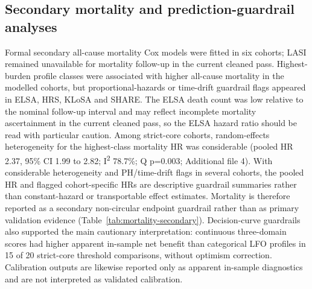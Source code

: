 \documentclass[pdflatex,sn-vancouver-num]{sn-jnl}
\begin{document}
\FloatBarrier

\subsection{Secondary mortality and prediction-guardrail analyses}

Formal secondary all-cause mortality Cox models were fitted in six cohorts; LASI remained unavailable for mortality follow-up in the current cleaned pass. Highest-burden profile classes were associated with higher all-cause mortality in the modelled cohorts, but proportional-hazards or time-drift guardrail flags appeared in ELSA, HRS, KLoSA and SHARE. The ELSA death count was low relative to the nominal follow-up interval and may reflect incomplete mortality ascertainment in the current cleaned pass, so the ELSA hazard ratio should be read with particular caution. Among strict-core cohorts, random-effects heterogeneity for the highest-class mortality HR was considerable (pooled HR 2.37, 95\% CI 1.99 to 2.82; I\textsuperscript{2} 78.7\%; Q p=0.003; Additional file 4). With considerable heterogeneity and PH/time-drift flags in several cohorts, the pooled HR and flagged cohort-specific HRs are descriptive guardrail summaries rather than constant-hazard or transportable effect estimates. Mortality is therefore reported as a secondary non-circular endpoint guardrail rather than as primary validation evidence (Table~\ref{tab:mortality-secondary}). Decision-curve guardrails also supported the main cautionary interpretation: continuous three-domain scores had higher apparent in-sample net benefit than categorical LFO profiles in 15 of 20 strict-core threshold comparisons, without optimism correction. Calibration outputs are likewise reported only as apparent in-sample diagnostics and are not interpreted as validated calibration.
\end{document}
